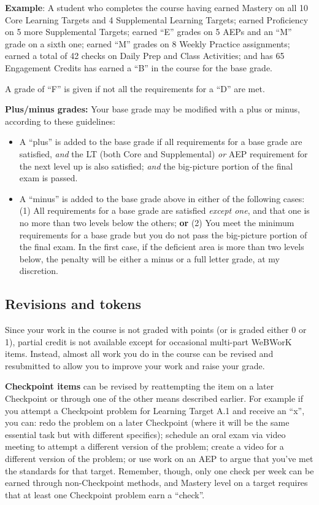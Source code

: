 \documentclass[]{article}
\providecommand{\tightlist}{%
  \setlength{\itemsep}{0pt}\setlength{\parskip}{0pt}}
\begin{document}
\textbf{Example}: A student who completes the course having earned
Mastery on all 10 Core Learning Targets and 4 Supplemental Learning
Targets; earned Proficiency on 5 more Supplemental Targets; earned ``E''
grades on 5 AEPs and an ``M'' grade on a sixth one; earned ``M'' grades
on 8 Weekly Practice assignments; earned a total of 42 checks on Daily
Prep and Class Activities; and has 65 Engagement Credits has earned a
``B'' in the course for the base grade.

A grade of ``F'' is given if not all the requirements for a ``D'' are
met.

\textbf{Plus/minus grades:} Your base grade may be modified with a plus
or minus, according to these guidelines:

\begin{itemize}
\tightlist
\item
  A ``plus'' is added to the base grade if all requirements for a base
  grade are satisfied, \emph{and} the LT (both Core and Supplemental)
  \emph{or} AEP requirement for the next level up is also satisfied;
  \emph{and} the big-picture portion of the final exam is passed.
\item
  A ``minus'' is added to the base grade above in either of the
  following cases: (1) All requirements for a base grade are satisfied
  \emph{except one}, and that one is no more than two levels below the
  others; \textbf{or} (2) You meet the minimum requirements for a base
  grade but you do not pass the big-picture portion of the final exam.
  In the first case, if the deficient area is more than two levels
  below, the penalty will be either a minus or a full letter grade, at
  my discretion.
\end{itemize}

\hypertarget{revisions-and-tokens}{%
\subsection{Revisions and tokens}\label{revisions-and-tokens}}

Since your work in the course is not graded with points (or is graded
either 0 or 1), partial credit is not available except for occasional
multi-part WeBWorK items. Instead, almost all work you do in the course
can be revised and resubmitted to allow you to improve your work and
raise your grade.

\textbf{Checkpoint items} can be revised by reattempting the item on a
later Checkpoint or through one of the other means described earlier.
For example if you attempt a Checkpoint problem for Learning Target A.1
and receive an ``x'', you can: redo the problem on a later Checkpoint
(where it will be the same essential task but with different specifics);
schedule an oral exam via video meeting to attempt a different version
of the problem; create a video for a different version of the problem;
or use work on an AEP to argue that you've met the standards for that
target. Remember, though, only one check per week can be earned through
non-Checkpoint methods, and Mastery level on a target requires that at
least one Checkpoint problem earn a ``check''.
\end{document}
